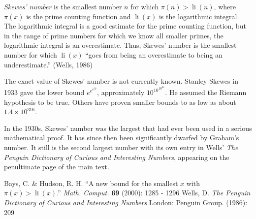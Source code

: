 \documentclass[12pt]{article}
\DeclareMathOperator{\li}{li}
\begin{document}
{\em Skewes' number} is the smallest number $n$ for which $\pi(n) > \li(n)$, where $\pi(x)$ is the prime counting function and $\li(x)$ is the logarithmic integral. The logarithmic integral is a good estimate for the prime counting function, but in the range of prime numbers for which we know all smaller primes, the logarithmic integral is an overestimate. Thus, Skewes' number is the smallest number for which $\li(x)$ ``goes from being an overestimate to being an underestimate.'' (Wells, 1986)

The exact value of Skewes' number is not currently known. Stanley Skewes in 1933 gave the lower bound $e^{e^{e^{79}}}$, approximately $10^{{10}^{{10}^{34}}}$. He assumed the Riemann hypothesis to be true. Others have proven smaller bounds to as low as about $1.4 \times 10^{316}$.

In the 1930s, Skewes' number was the largest that had ever been used in a serious mathematical proof. It has since then been significantly dwarfed by Graham's number. It still is the second largest number with its own entry in Wells' {\it The Penguin Dictionary of Curious and Interesting Numbers}, appearing on the penultimate page of the main text.

\begin{thebibliography}{1}
 Bays, C. \& Hudson, R. H. ``A new bound for the smallest $x$ with $\pi(x) > \li(x)$.'' {\it Math. Comput.} {\bf 69} (2000): 1285 - 1296
 Wells, D. {\it The Penguin Dictionary of Curious and Interesting Numbers} London: Penguin Group. (1986): 209
\end{thebibliography}
\end{document}

